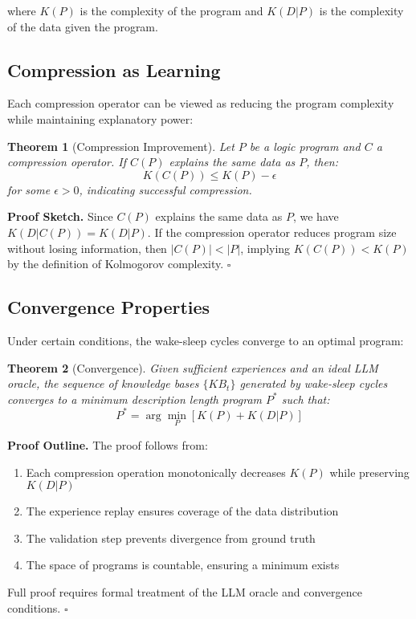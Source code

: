 \documentclass[10pt,conference]{IEEEtran}
\newtheorem{theorem}{Theorem}
\newenvironment{proof}[1][Proof]{\textbf{#1.} }{\hfill$\square$}
\begin{document}
where $K(P)$ is the complexity of the program and $K(D|P)$ is the complexity of the data given the program.

\subsection{Compression as Learning}

Each compression operator can be viewed as reducing the program complexity while maintaining explanatory power:

\begin{theorem}[Compression Improvement]
Let $P$ be a logic program and $C$ a compression operator. If $C(P)$ explains the same data as $P$, then:
\begin{equation}
K(C(P)) \leq K(P) - \epsilon
\end{equation}
for some $\epsilon > 0$, indicating successful compression.
\end{theorem}

\begin{proof}[Proof Sketch]
Since $C(P)$ explains the same data as $P$, we have $K(D|C(P)) = K(D|P)$. If the compression operator reduces program size without losing information, then $|C(P)| < |P|$, implying $K(C(P)) < K(P)$ by the definition of Kolmogorov complexity.
\end{proof}

\subsection{Convergence Properties}

Under certain conditions, the wake-sleep cycles converge to an optimal program:

\begin{theorem}[Convergence]
Given sufficient experiences and an ideal LLM oracle, the sequence of knowledge bases $\{KB_t\}$ generated by wake-sleep cycles converges to a minimum description length program $P^*$ such that:
\begin{equation}
P^* = \arg\min_P [K(P) + K(D|P)]
\end{equation}
\end{theorem}

\begin{proof}[Proof Outline]
The proof follows from:
\begin{enumerate}
\item Each compression operation monotonically decreases $K(P)$ while preserving $K(D|P)$
\item The experience replay ensures coverage of the data distribution
\item The validation step prevents divergence from ground truth
\item The space of programs is countable, ensuring a minimum exists
\end{enumerate}
Full proof requires formal treatment of the LLM oracle and convergence conditions.
\end{proof}
\end{document}
